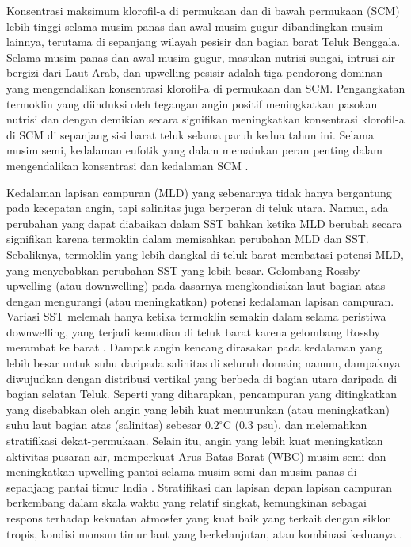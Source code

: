 \begin{spacing}{1.5}
	Konsentrasi maksimum klorofil-a di permukaan dan di bawah permukaan (SCM) lebih tinggi selama musim panas dan awal musim gugur dibandingkan musim lainnya, terutama di sepanjang wilayah pesisir dan bagian barat Teluk Benggala. Selama musim panas dan awal musim gugur, masukan nutrisi sungai, intrusi air bergizi dari Laut Arab, dan upwelling pesisir adalah tiga pendorong dominan yang mengendalikan konsentrasi klorofil-a di permukaan dan SCM. Pengangkatan termoklin yang diinduksi oleh tegangan angin positif meningkatkan pasokan nutrisi dan dengan demikian secara signifikan meningkatkan konsentrasi klorofil-a di SCM di sepanjang sisi barat teluk selama paruh kedua tahun ini. Selama musim semi, kedalaman eufotik yang dalam memainkan peran penting dalam mengendalikan konsentrasi dan kedalaman SCM .
	
	Kedalaman lapisan campuran (MLD) yang sebenarnya tidak hanya bergantung pada kecepatan angin, tapi salinitas juga berperan di teluk utara. Namun, ada perubahan yang dapat diabaikan dalam SST bahkan ketika MLD berubah secara signifikan karena termoklin dalam memisahkan perubahan MLD dan SST. Sebaliknya, termoklin yang lebih dangkal di teluk barat membatasi potensi MLD, yang menyebabkan perubahan SST yang lebih besar. Gelombang Rossby upwelling (atau downwelling) pada dasarnya mengkondisikan laut bagian atas dengan mengurangi (atau meningkatkan) potensi kedalaman lapisan campuran. Variasi SST melemah hanya ketika termoklin semakin dalam selama peristiwa downwelling, yang terjadi kemudian di teluk barat karena gelombang Rossby merambat ke barat . Dampak angin kencang dirasakan pada kedalaman yang lebih besar untuk suhu daripada salinitas di seluruh domain; namun, dampaknya diwujudkan dengan distribusi vertikal yang berbeda di bagian utara daripada di bagian selatan Teluk. Seperti yang diharapkan, pencampuran yang ditingkatkan yang disebabkan oleh angin yang lebih kuat menurunkan (atau meningkatkan) suhu laut bagian atas (salinitas) sebesar $0.2^\circ$C (0.3 psu), dan melemahkan stratifikasi dekat-permukaan. Selain itu, angin yang lebih kuat meningkatkan aktivitas pusaran air, memperkuat Arus Batas Barat (WBC) musim semi dan meningkatkan upwelling pantai selama musim semi dan musim panas di sepanjang pantai timur India . Stratifikasi dan lapisan depan lapisan campuran berkembang dalam skala waktu yang relatif singkat, kemungkinan sebagai respons terhadap kekuatan atmosfer yang kuat baik yang terkait dengan siklon tropis, kondisi monsun timur laut yang berkelanjutan, atau kombinasi keduanya . 
	

\end{spacing}
